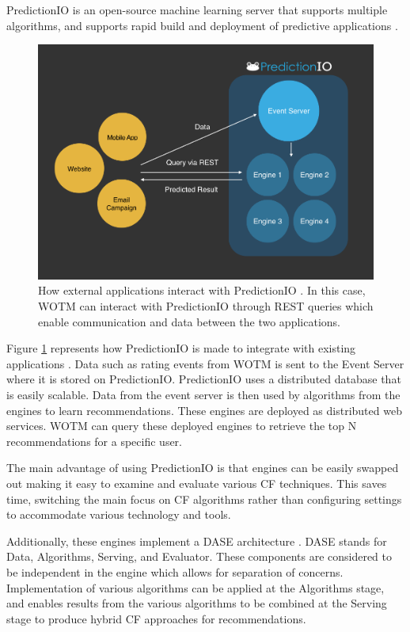 PredictionIO is an open-source machine learning server that supports multiple algorithms, and supports rapid build and deployment of predictive applications \cite{predictionio, predictionio2}.

\begin{figure}
\centering
\includegraphics[scale=0.35]{images/predictionIO}
\caption{ How external applications interact with PredictionIO \cite{predictionio}. In this case, WOTM can interact with PredictionIO through REST queries which enable communication and data between the two applications.}
\label{fig:predictionIO}
\end{figure}


Figure \ref{fig:predictionIO} represents how PredictionIO is made to integrate with existing applications \cite{predictionio}. Data such as rating events from WOTM is sent to the Event Server where it is stored on PredictionIO. PredictionIO uses a distributed database that is easily scalable. Data from the event server is then used by algorithms from the engines to learn recommendations. These engines are deployed as distributed web services. WOTM can query these deployed engines to retrieve the top N recommendations for a specific user. 

The main advantage of using PredictionIO is that engines can be easily swapped out making it easy to examine and evaluate various CF techniques. This saves time, switching the main focus on CF algorithms rather than configuring settings to accommodate various technology and tools.

Additionally, these engines implement a DASE architecture \cite{predictionio}. DASE stands for Data, Algorithms, Serving, and Evaluator. These components are considered to be independent in the engine which allows for separation of concerns. Implementation of various algorithms can be applied at the Algorithms stage, and enables results from the various algorithms to be combined at the Serving stage to produce hybrid CF approaches for recommendations.

